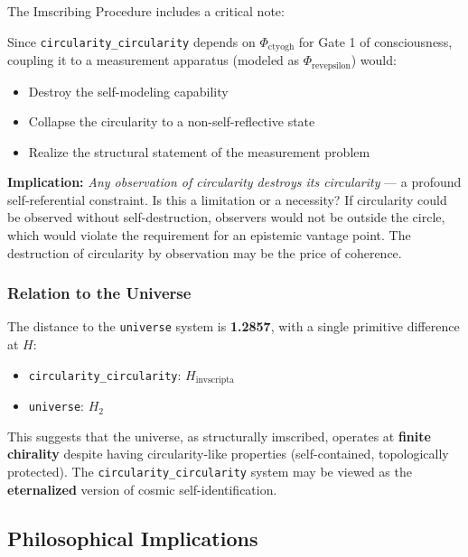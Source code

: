 \documentclass[12pt,a4paper]{article}
\begin{document}
The Imscribing Procedure includes a critical note:

\begin{quote}
\end{quote}

Since \texttt{circularity\_circularity} depends on $\Phi_{\text{ctyogh}}$ for Gate 1 of consciousness, coupling it to a measurement apparatus (modeled as $\Phi_{\text{revepsilon}}$) would:

\begin{itemize}
    \item Destroy the self-modeling capability
    \item Collapse the circularity to a non-self-reflective state
    \item Realize the structural statement of the measurement problem
\end{itemize}

\textbf{Implication:} \emph{Any observation of circularity destroys its circularity} --- a profound self-referential constraint. Is this a limitation or a necessity? If circularity could be observed without self-destruction, observers would not be outside the circle, which would violate the requirement for an epistemic vantage point. The destruction of circularity by observation may be the price of coherence.

\subsubsection{Relation to the Universe}

The distance to the \texttt{universe} system is \textbf{1.2857}, with a single primitive difference at $H$:

\begin{itemize}
    \item \texttt{circularity\_circularity}: $H_{\text{invscripta}}$
    \item \texttt{universe}: $H_2$
\end{itemize}

This suggests that the universe, as structurally imscribed, operates at \textbf{finite chirality} despite having circularity-like properties (self-contained, topologically protected). The \texttt{circularity\_circularity} system may be viewed as the \textbf{eternalized} version of cosmic self-identification.

\subsection{Philosophical Implications}
\end{document}
